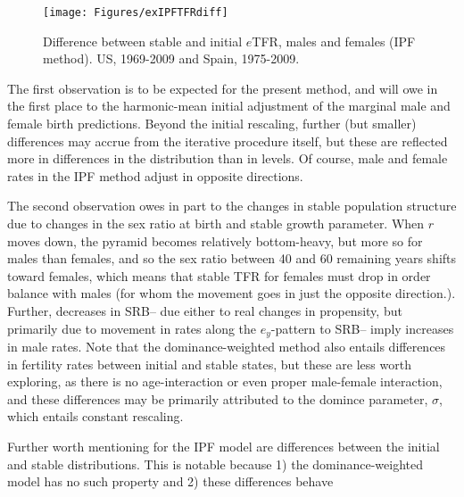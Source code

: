 \begin{figure}[ht!]
        \centering  
          \caption{Difference between stable and initial $e$TFR, males and
          females (IPF method). US, 1969-2009 and Spain,
          1975-2009.}
           \texttt{[image: Figures/exIPFTFRdiff]}
          \label{fig:exIPFTFRdiff}
\end{figure}

The first observation
is to be expected for the present method, and will owe in the first place to the
harmonic-mean initial adjustment of the marginal male and female birth
predictions. Beyond the initial rescaling, further (but smaller) differences may
accrue from the iterative procedure itself, but these are reflected more in
differences in the distribution than in levels. Of course, male and female rates
in the IPF method adjust in opposite directions. 

The second observation owes
in part to the changes in stable population structure due to changes in the sex
ratio at birth and stable growth parameter. When $r$ moves down, the pyramid
becomes relatively bottom-heavy, but more so for males than females, and so the
sex ratio between 40 and 60 remaining years shifts toward females, which means
that stable TFR for females must drop in order balance with males (for whom the
movement goes in just the opposite direction.). Further, decreases in SRB-- due
either to real changes in propensity, but primarily due to movement in rates
along the $e_y$-pattern to SRB-- imply increases in male rates. Note that the
dominance-weighted method also entails differences in fertility rates
between initial and stable states, but these are less worth exploring, as there
is no age-interaction or even proper male-female interaction, and these
differences may be primarily attributed to the domince parameter, $\sigma$,
which entails constant rescaling.

Further worth mentioning for the IPF model are differences between the initial
and stable distributions. This is notable because 1) the dominance-weighted
model has no such property and 2) these differences behave


\FloatBarrier